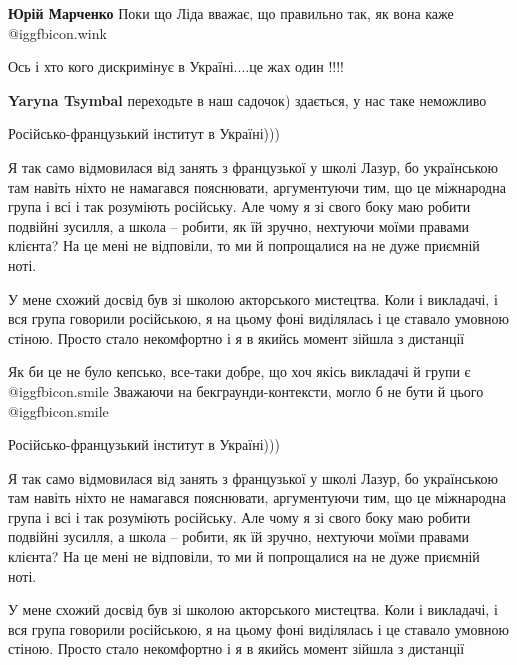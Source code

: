 \begin{itemize}
\begin{itemize}
\textbf{Юрій Марченко} Поки що Ліда вважає, що правильно так, як вона каже  @igg{fbicon.wink} 

Ось і хто кого дискримінує в Україні....це жах один !!!!

\textbf{Yaryna Tsymbal} переходьте в наш садочок) здається, у нас таке неможливо
\end{itemize} %

Російсько-французький інститут в Україні)))


Я так само відмовилася від занять з французької у школі Лазур, бо українською
там навіть ніхто не намагався пояснювати, аргументуючи тим, що це міжнародна
група і всі і так розуміють російську. Але чому я зі свого боку маю робити
подвійні зусилля, а школа – робити, як їй зручно, нехтуючи моїми правами
клієнта? На це мені не відповіли, то ми й попрощалися на не дуже приємній ноті.


У мене схожий досвід був зі школою акторського мистецтва. Коли і викладачі, і
вся група говорили російською, я на цьому фоні виділялась і це ставало умовною
стіною. Просто стало некомфортно і я в якийсь момент зійшла з дистанції


Як би це не було кепсько, все-таки добре, що хоч якісь викладачі й групи є  @igg{fbicon.smile} 
Зважаючи на бекграунди-контексти, могло б не бути й цього  @igg{fbicon.smile} 

Російсько-французький інститут в Україні)))


Я так само відмовилася від занять з французької у школі Лазур, бо українською
там навіть ніхто не намагався пояснювати, аргументуючи тим, що це міжнародна
група і всі і так розуміють російську. Але чому я зі свого боку маю робити
подвійні зусилля, а школа – робити, як їй зручно, нехтуючи моїми правами
клієнта? На це мені не відповіли, то ми й попрощалися на не дуже приємній ноті.


У мене схожий досвід був зі школою акторського мистецтва. Коли і викладачі, і
вся група говорили російською, я на цьому фоні виділялась і це ставало умовною
стіною. Просто стало некомфортно і я в якийсь момент зійшла з дистанції


\end{itemize}
